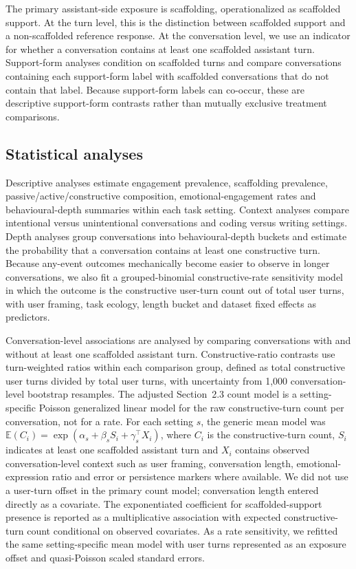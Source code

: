 The primary assistant-side exposure is scaffolding, operationalized as scaffolded support. At the turn level, this is the distinction between scaffolded support and a non-scaffolded reference response. At the conversation level, we use an indicator for whether a conversation contains at least one scaffolded assistant turn. Support-form analyses condition on scaffolded turns and compare conversations containing each support-form label with scaffolded conversations that do not contain that label. Because support-form labels can co-occur, these are descriptive support-form contrasts rather than mutually exclusive treatment comparisons.

\subsection{Statistical analyses}

Descriptive analyses estimate engagement prevalence, scaffolding prevalence, passive/active/constructive composition, emotional-engagement rates and behavioural-depth summaries within each task setting. Context analyses compare intentional versus unintentional conversations and coding versus writing settings. Depth analyses group conversations into behavioural-depth buckets and estimate the probability that a conversation contains at least one constructive turn. Because any-event outcomes mechanically become easier to observe in longer conversations, we also fit a grouped-binomial constructive-rate sensitivity model in which the outcome is the constructive user-turn count out of total user turns, with user framing, task ecology, length bucket and dataset fixed effects as predictors.

Conversation-level associations are analysed by comparing conversations with and without at least one scaffolded assistant turn. Constructive-ratio contrasts use turn-weighted ratios within each comparison group, defined as total constructive user turns divided by total user turns, with uncertainty from 1,000 conversation-level bootstrap resamples. The adjusted Section~2.3 count model is a setting-specific Poisson generalized linear model for the raw constructive-turn count per conversation, not for a rate. For each setting $s$, the generic mean model was $\mathbb{E}(C_i)=\exp(\alpha_s+\beta_s S_i+\gamma_s^\top X_i)$, where $C_i$ is the constructive-turn count, $S_i$ indicates at least one scaffolded assistant turn and $X_i$ contains observed conversation-level context such as user framing, conversation length, emotional-expression ratio and error or persistence markers where available. We did not use a user-turn offset in the primary count model; conversation length entered directly as a covariate. The exponentiated coefficient for scaffolded-support presence is reported as a multiplicative association with expected constructive-turn count conditional on observed covariates. As a rate sensitivity, we refitted the same setting-specific mean model with user turns represented as an exposure offset and quasi-Poisson scaled standard errors.


